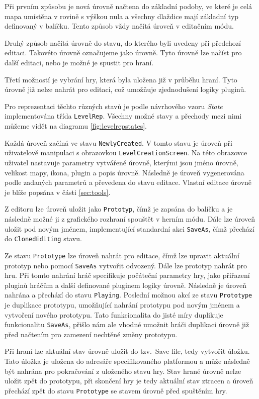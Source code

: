 Při prvním způsobu je nová úrovně načtena do základní podoby, ve které je celá mapa umístěna v rovině s výškou nula a všechny dlaždice mají základní typ definovaný v balíčku. Tento způsob vždy načítá úroveň v editačním módu.

Druhý způsob načítá úrovně do stavu, do kterého byli uvedeny při předchozí editaci. Takovéto úrovně označujeme jako  úrovně. Tyto úrovně lze načíst pro další editaci, nebo je možné je spustit pro hraní.

Třetí možností je vybrání hry, která byla uložena již v průběhu hraní. Tyto úrovně již nelze nahrát pro editaci, což umožňuje zjednodušení logiky pluginů. 

Pro reprezentaci těchto různých stavů je podle návrhového vzoru \textit{State} implementována třída \texttt{LevelRep}. Všechny možné stavy a přechody mezi nimi můžeme vidět na diagramu \ref{fig:levelrepstates}. 

Každá úroveň začíná ve stavu \texttt{NewlyCreated}. V tomto stavu je úroveň při uživatelově manipulaci s obrazovkou \texttt{LevelCreationScreen}. Na této obrazovce uživatel nastavuje parametry vytvářené úrovně, kterými jsou jméno úrovně, velikost mapy, ikona, plugin a popis úrovně. Následně je úroveň vygenerována podle zadaných parametrů a převedena do stavu editace. Vlastní editace úrovně je blíže popsána v části \ref{sec:tools}. 

Z editoru lze úroveň uložit jako \texttt{Prototyp}, čímž je zapsána do balíčku a je následně možné ji z grafického rozhraní spouštět v herním módu. Dále lze úroveň uložit pod novým jménem, implementující standardní akci \texttt{SaveAs}, čímž přechází do \texttt{ClonedEditing} stavu. 

Ze stavu \texttt{Prototype} lze úroveň nahrát pro editace, čímž lze upravit aktuální prototyp nebo pomocí \texttt{SaveAs} vytvořit odvozený. Dále lze prototyp nahrát pro hru. Při tomto nahrání hráč specifikuje počáteční parametry hry, jako přiřazení pluginů hráčům a další definované pluginem logiky úrovně. Následně je úroveň nahrána a přechází do stavu \texttt{Playing}. Poslední možnou akcí ze stavu \texttt{Prototype} je duplikace prototypu, umožňující nahrání prototypu pod novým jménem a vytvoření nového prototypu. Tato funkcionalita do jisté míry duplikuje funkcionalitu \texttt{SaveAs}, přišlo nám ale vhodné umožnit hráči duplikaci úrovně již před načtením pro zamezení nechtěné změny prototypu.

Při hraní lze aktuální stav úrovně uložit do tzv.~Save file, tedy vytvořit úložku. Tato úložka je uložena do adresáře specifikovaného platformou a může následně být nahrána pro pokračování z uloženého stavu hry. Stav hrané úrovně nelze uložit zpět do prototypu, při skončení hry je tedy aktuální stav ztracen a úroveň přechází zpět do stavu \texttt{Prototype} se stavem úrovně před spuštěním hry.

